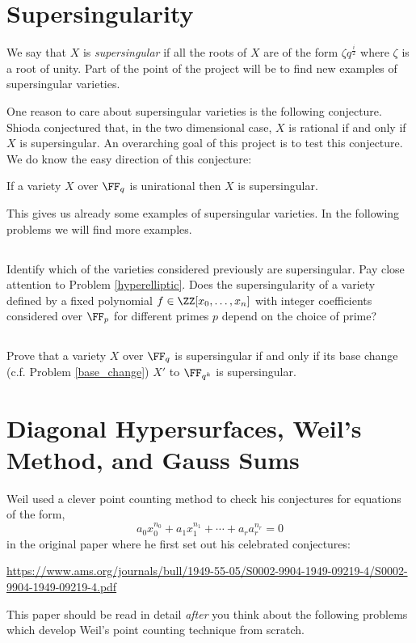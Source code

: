 \documentclass[12pt]{article}
\begin{document}
\section{Supersingularity}

We say that $X$ is \textit{supersingular} if all the roots of $X$ are of the form $\zeta q^{\frac{i}{2}}$ where $\zeta$ is a root of unity. Part of the point of the project will be to find new examples of supersingular varieties. 
\par
One reason to care about supersingular varieties is the following conjecture. Shioda \cite{shioda_conjecture} conjectured that, in the two dimensional case, $X$ is rational if and only if $X$ is supersingular. An overarching goal of this project is to test this conjecture. We do know the easy direction of this conjecture:

\begin{prop}
If a variety $X$ over $\FF_q$ is unirational then $X$ is supersingular. 
\end{prop}

This gives us already some examples of supersingular varieties. In the following problems we will find more examples.

\subsection{}

Identify which of the varieties considered previously are supersingular. Pay close attention to Problem \ref{hyperelliptic}. Does the supersingularity of a variety defined by a fixed polynomial $f \in \ZZ[x_0, \dots, x_n]$ with integer coefficients considered over $\FF_p$ for different primes $p$ depend on the choice of prime? 

\subsection{}

Prove that a variety $X$ over $\FF_q$ is supersingular if and only if its base change (c.f. Problem \ref{base_change}) $X'$ to $\FF_{q^k}$ is supersingular.

\section{Diagonal Hypersurfaces, Weil's Method, and Gauss Sums}

Weil used a clever point counting method to check his conjectures for equations of the form,
\[ a_0 x_0^{n_0} + a_1 x_1^{n_1} + \cdots + a_r a_r^{n_r} = 0 \]
in the original paper \cite{weil} where he first set out his celebrated conjectures:
\begin{center}
\url{https://www.ams.org/journals/bull/1949-55-05/S0002-9904-1949-09219-4/S0002-9904-1949-09219-4.pdf}
\end{center}
This paper should be read in detail \textit{after} you think about the following problems which develop Weil's point counting technique from scratch.
\end{document}
